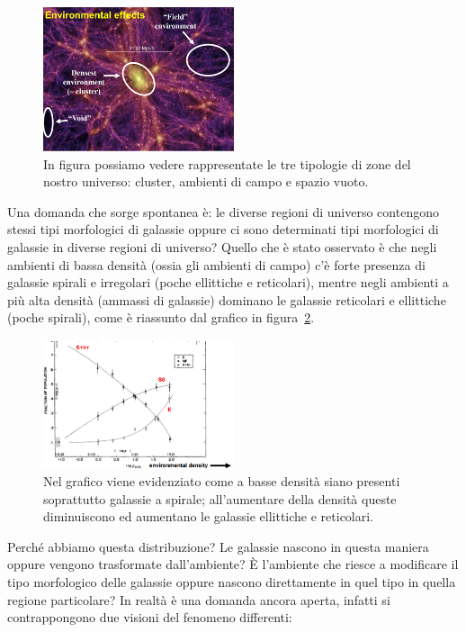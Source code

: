 \begin{figure}
	\centering
	\includegraphics[width = 0.5\textwidth]{immagini/non-omogeneita-universo.png}
	\caption{In figura possiamo vedere rappresentate le tre tipologie di zone del nostro universo: cluster, ambienti di campo e spazio vuoto.}
	\label{fig:non-omogeneo-universo}
\end{figure}

Una domanda che sorge spontanea è: le diverse regioni di universo contengono stessi tipi morfologici di galassie oppure ci sono determinati tipi morfologici di galassie in diverse regioni di universo? Quello che è stato osservato è che negli ambienti di bassa densità (ossia gli ambienti di campo) c’è forte presenza di galassie spirali e irregolari (poche ellittiche e reticolari), mentre negli ambienti a più alta densità (ammassi di galassie) dominano le galassie reticolari e ellittiche (poche spirali), come è riassunto dal grafico in figura~\ref{fig:grafico-densità-morfologia}.

\begin{figure}[!htb]
	\centering
	\includegraphics[width = 0.5\textwidth]{immagini/enviromental-density.png}
	\caption{Nel grafico viene evidenziato come a basse densità siano presenti soprattutto galassie a spirale; all'aumentare della densità queste diminuiscono ed aumentano le galassie ellittiche e reticolari.}
	\label{fig:grafico-densità-morfologia}
\end{figure}

Perché abbiamo questa distribuzione? Le galassie nascono in questa maniera oppure vengono trasformate dall’ambiente? È l’ambiente che riesce a modificare il tipo morfologico delle galassie oppure nascono direttamente in quel tipo in quella regione particolare? In realtà è una domanda ancora aperta, infatti si contrappongono due visioni del fenomeno differenti:

